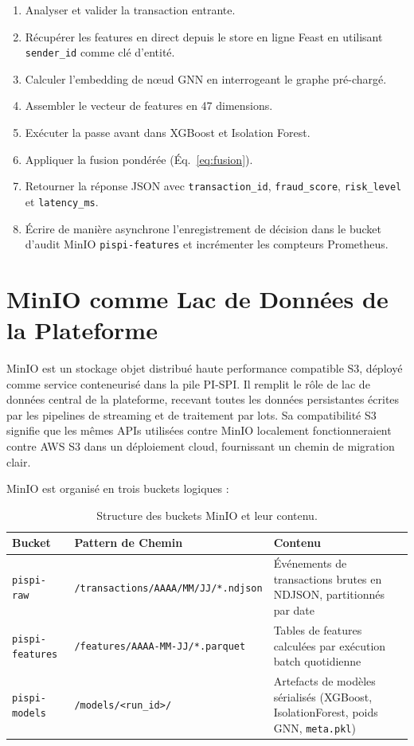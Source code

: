 \documentclass[12pt,a4paper,oneside]{book}
\theoremstyle{definition}
\theoremstyle{plain}
\begin{document}
\begin{enumerate}
  \item Analyser et valider la transaction entrante.
  \item Récupérer les features en direct depuis le store en ligne Feast en utilisant \texttt{sender\_id} comme clé d'entité.
  \item Calculer l'embedding de nœud GNN en interrogeant le graphe pré-chargé.
  \item Assembler le vecteur de features en 47 dimensions.
  \item Exécuter la passe avant dans XGBoost et Isolation Forest.
  \item Appliquer la fusion pondérée (Éq.~\ref{eq:fusion}).
  \item Retourner la réponse JSON avec \texttt{transaction\_id}, \texttt{fraud\_score}, \texttt{risk\_level} et \texttt{latency\_ms}.
  \item Écrire de manière asynchrone l'enregistrement de décision dans le bucket d'audit MinIO \texttt{pispi-features} et incrémenter les compteurs Prometheus.
\end{enumerate}

\section{MinIO comme Lac de Données de la Plateforme}

MinIO est un stockage objet distribué haute performance compatible S3, déployé comme service conteneurisé dans la pile PI-SPI. Il remplit le rôle de lac de données central de la plateforme, recevant toutes les données persistantes écrites par les pipelines de streaming et de traitement par lots. Sa compatibilité S3 signifie que les mêmes APIs utilisées contre MinIO localement fonctionneraient contre AWS S3 dans un déploiement cloud, fournissant un chemin de migration clair.

MinIO est organisé en trois buckets logiques :

\begin{table}[H]
  \centering
  \caption{Structure des buckets MinIO et leur contenu.}
  \label{tab:minio_buckets}
  \begin{tabularx}{\linewidth}{llX}
    \toprule
    \textbf{Bucket} & \textbf{Pattern de Chemin} & \textbf{Contenu} \\
    \midrule
    \texttt{pispi-raw}      & \texttt{/transactions/AAAA/MM/JJ/*.ndjson} & Événements de transactions brutes en NDJSON, partitionnés par date \\
    \texttt{pispi-features} & \texttt{/features/AAAA-MM-JJ/*.parquet}    & Tables de features calculées par exécution batch quotidienne \\
    \texttt{pispi-models}   & \texttt{/models/<run\_id>/}                & Artefacts de modèles sérialisés (XGBoost, IsolationForest, poids GNN, \texttt{meta.pkl}) \\
    \bottomrule
  \end{tabularx}
\end{table}
\end{document}
